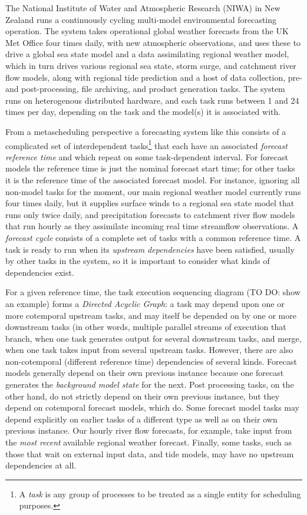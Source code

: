 \documentclass[11pt,a4paper]{article}
\begin{document}
The National Institute of Water and Atmospheric Research (NIWA) in New
Zealand runs a continuously cycling multi-model environmental
forecasting operation. The system takes operational global weather
forecasts from the UK Met Office four times daily, with new atmospheric
observations, and uses these to drive a global sea state model and a
data assimilating regional weather model, which in turn drives various
regional sea state, storm surge, and catchment river flow models, along
with regional tide prediction and a host of data collection, pre- and
post-processing, file archiving, and product generation tasks. 
The system runs on heterogenous distributed hardware, and each task runs
between 1 and 24 times per day, depending on the task and the model(s)
it is associated with. 

From a metascheduling perspective a forecasting system like this
consists of a complicated set of interdependent tasks\footnote{A {\em
task} is any group of processes to be treated as a single entity for
scheduling purposes.} that each have an associated {\em forecast
reference time} and which repeat on some task-dependent interval.  For
forecast models the reference time is just the nominal forecast start
time; for other tasks it is the reference time of the associated
forecast model. For instance, ignoring all non-model tasks for the
moment, our main regional weather model currently runs four times daily,
but it supplies surface winds to a regional sea state model that runs
only twice daily, and precipitation forecasts to catchment river flow
models that run hourly as they assimilate incoming real time streamflow
observations.  A {\em forecast cycle} consists of a complete set of
tasks with a common reference time.  A task is ready to run when its
{\em upstream dependencies} have been satisfied, usually by other tasks
in the system, so it is important to consider what kinds of dependencies
exist. 

For a given reference time, the task execution sequencing diagram (TO
DO: show an example) forms a {\em Directed Acyclic Graph}: a task may
depend upon one or more cotemporal upstream tasks, and may itself be
depended on by one or more downstream tasks (in other words, multiple
parallel streams of execution that branch, when one task generates
output for several downstream tasks, and merge, when one task takes
input from several upstream tasks.  However, there are also
non-cotemporal (different reference time) dependencies of several kinds.
Forecast models generally depend on their own previous instance because
one forecast generates the {\em background model state} for the next.
Post processing tasks, on the other hand, do not strictly depend on
their own previous instance, but they depend on cotemporal forecast
models, which do.  Some forecast model tasks may depend explicitly on
earlier tasks of a different type as well as on their own previous
instance. Our hourly river flow forecasts, for example, take input from
the {\em most recent} available regional weather forecast.  Finally,
some tasks, such as those that wait on external input data, and tide
models, may have no upstream dependencies at all.
\end{document}
